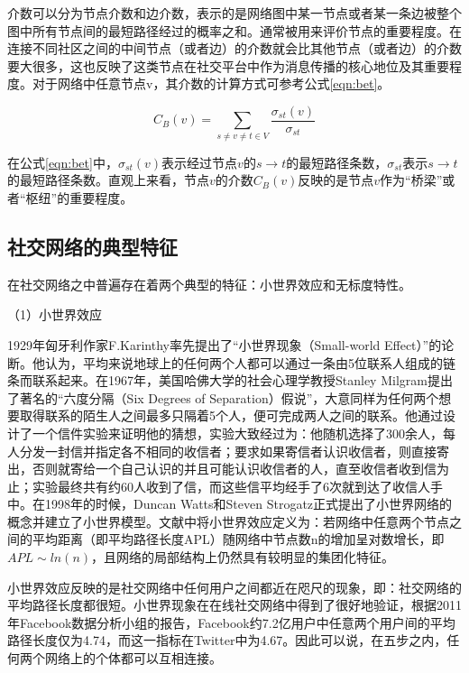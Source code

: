 介数可以分为节点介数和边介数，表示的是网络图中某一节点或者某一条边被整个图中所有节点间的最短路径经过的概率之和。通常被用来评价节点的重要程度。在连接不同社区之间的中间节点（或者边）的介数就会比其他节点（或者边）的介数要大很多，这也反映了这类节点在社交平台中作为消息传播的核心地位及其重要程度。对于网络中任意节点v，其介数的计算方式可参考公式\ref{eqn:bet}。

\begin{equation}
  \label{eqn:bet}
  C_B(v)=\sum _{s\neq v\neq t \in V}\frac{\sigma_{st}(v)}{\sigma_{st}}
\end{equation}

在公式\ref{eqn:bet}中，$\sigma_{st}(v)$表示经过节点$v$的$s\rightarrow t$的最短路径条数，$\sigma_{st}$表示$s\rightarrow t$的最短路径条数。直观上来看，节点$v$的介数$C_B(v)$反映的是节点$v$作为“桥梁”或者“枢纽”的重要程度。

\subsection{社交网络的典型特征}
在社交网络之中普遍存在着两个典型的特征：小世界效应和无标度特性。

（1）小世界效应

1929年匈牙利作家F.Karinthy率先提出了“小世界现象（Small-world Effect）”的论断。他认为，平均来说地球上的任何两个人都可以通过一条由5位联系人组成的链条而联系起来。在1967年，美国哈佛大学的社会心理学教授Stanley Milgram提出了著名的“六度分隔（Six Degrees of Separation）假说”\cite{Milgram1967The}，大意同样为任何两个想要取得联系的陌生人之间最多只隔着5个人，便可完成两人之间的联系。他通过设计了一个信件实验来证明他的猜想，实验大致经过为：他随机选择了300余人，每人分发一封信并指定各不相同的收信者；要求如果寄信者认识收信者，则直接寄出，否则就寄给一个自己认识的并且可能认识收信者的人，直至收信者收到信为止；实验最终共有约60人收到了信，而这些信平均经手了6次就到达了收信人手中。在1998年的时候，Duncan Watts和Steven Strogatz正式提出了小世界网络的概念并建立了小世界模型\cite{Watts1998Collectivedynamics}。文献中将小世界效应定义为：若网络中任意两个节点之间的平均距离（即平均路径长度APL）随网络中节点数n的增加呈对数增长，即$APL\sim ln(n)$，且网络的局部结构上仍然具有较明显的集团化特征。

小世界效应反映的是社交网络中任何用户之间都近在咫尺的现象，即：社交网络的平均路径长度都很短。小世界现象在在线社交网络中得到了很好地验证，根据2011年Facebook数据分析小组的报告，Facebook约7.2亿用户中任意两个用户间的平均路径长度仅为4.74，而这一指标在Twitter中为4.67。因此可以说，在五步之内，任何两个网络上的个体都可以互相连接。

